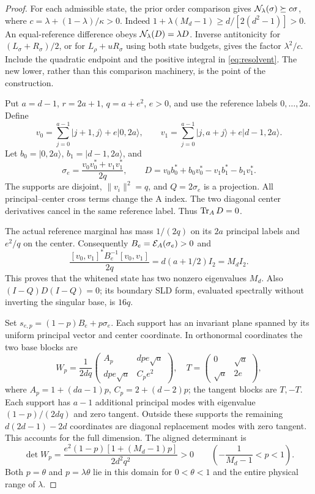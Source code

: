 \begin{proof}
For each admissible state, the prior order comparison gives
\(\mathcal N_\lambda(\sigma)\succeq c\sigma\), where
\(c=\lambda+(1-\lambda)/\kappa>0\).
Indeed \(1+\lambda(M_d-1)\ge d/[2(d^2-1)]>0\).
An equal-reference difference obeys \(\mathcal N_\lambda(D)=\lambda D\). Inverse antitonicity for \((L_\sigma+R_\sigma)/2\), or for \(L_\rho+uR_\sigma\) using both state budgets, gives the factor \(\lambda^2/c\). Include the quadratic endpoint and the positive integral in \eqref{eq:resolvent}. The new lower, rather than this comparison machinery, is the point of the construction.

Put \(a=d-1\), \(r=2a+1\), \(q=a+e^2\), \(e>0\), and use the reference labels \(0,\ldots,2a\). Define
\[
 v_0=\sum_{j=0}^{a-1}|j+1,j\rangle+e|0,2a\rangle,\qquad
 v_1=\sum_{j=0}^{a-1}|j,a+j\rangle+e|d-1,2a\rangle.
\]
Let \(b_0=|0,2a\rangle\), \(b_1=|d-1,2a\rangle\), and
\[
 \sigma_e=\frac{v_0v_0^*+v_1v_1^*}{2q},\qquad
 D=v_0b_0^*+b_0v_0^*-v_1b_1^*-b_1v_1^*.
\]
The supports are disjoint, \(\|v_i\|^2=q\), and \(Q=2\sigma_e\) is a projection. All principal--center cross terms change the A index. The two diagonal center derivatives cancel in the same reference label. Thus \(\operatorname{Tr}_AD=0\).

The actual reference marginal has mass \(1/(2q)\) on its \(2a\) principal labels and \(e^2/q\) on the center. Consequently \(B_e=\mathcal E_A(\sigma_e)>0\) and
\[
 \frac{[v_0,v_1]^*B_e^{-1}[v_0,v_1]}{2q}
 =d(a+1/2)I_2=M_d I_2.
\]
This proves that the whitened state has two nonzero eigenvalues \(M_d\). Also \((I-Q)D(I-Q)=0\); its boundary SLD form, evaluated spectrally without inverting the singular base, is \(16q\).

Set \(s_{e,p}=(1-p)B_e+p\sigma_e\). Each support has an invariant plane spanned by its uniform principal vector and center coordinate. In orthonormal coordinates the two base blocks are
\begin{equation}\label{eq:principal-plane}
 W_p=\frac1{2dq}
 \begin{pmatrix}A_p&dpe\sqrt a\\dpe\sqrt a&C_pe^2\end{pmatrix},
 \quad T=\begin{pmatrix}0&\sqrt a\\\sqrt a&2e\end{pmatrix},
\end{equation}
where \(A_p=1+(da-1)p\), \(C_p=2+(d-2)p\); the tangent blocks are \(T,-T\).
Each support has \(a-1\) additional principal modes with eigenvalue \((1-p)/(2dq)\) and zero tangent. Outside these supports the remaining \(d(2d-1)-2d\) coordinates are diagonal replacement modes with zero tangent. This accounts for the full dimension.
The aligned determinant is
\[
 \det W_p=\frac{e^2(1-p)[1+(M_d-1)p]}{2d^2q^2}>0
 \qquad\left(-\frac1{M_d-1}<p<1\right).
\]
Both \(p=\theta\) and \(p=\lambda\theta\) lie in this domain for \(0<\theta<1\) and the entire physical range of \(\lambda\).


\end{proof}

